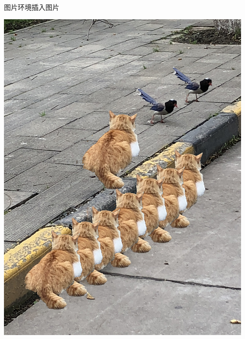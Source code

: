 \documentclass[no-math, compress]{beamer}
\begin{document}
\begin{frame}{图片环境}{插入图片}
    \begin{center}
        \includegraphics[height=0.6\textheight]{image01}
    \end{center}
\end{frame}
\end{document}
